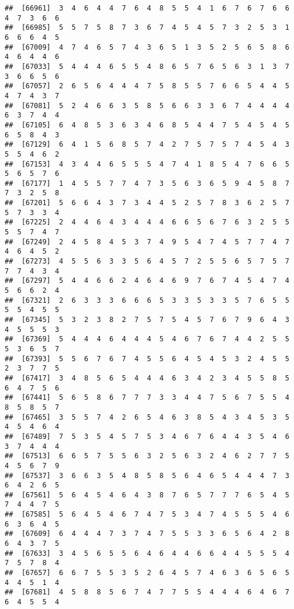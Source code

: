 \documentclass[
]{book}
\begin{document}
\begin{verbatim}
##  [66961]  3  4  6  4  4  7  6  4  8  5  5  4  1  6  7  6  7  6  6  4  7  3  6  6
##  [66985]  5  5  7  5  8  7  3  6  7  4  5  4  5  7  3  2  5  3  1  6  6  6  4  5
##  [67009]  4  7  4  6  5  7  4  3  6  5  1  3  5  2  5  6  5  8  6  4  6  4  4  6
##  [67033]  5  4  4  4  6  5  5  4  8  6  5  7  6  5  6  3  1  3  7  3  6  6  5  6
##  [67057]  2  6  5  6  4  4  4  7  5  8  5  5  7  6  6  5  4  4  5  4  7  4  3  7
##  [67081]  5  2  4  6  6  3  5  8  5  6  6  3  3  6  7  4  4  4  4  6  3  7  4  4
##  [67105]  6  4  8  5  3  6  3  4  6  8  5  4  4  7  5  4  5  4  5  6  5  8  4  3
##  [67129]  6  4  1  5  6  8  5  7  4  2  7  5  7  5  7  4  5  4  3  5  5  4  6  2
##  [67153]  4  3  4  4  6  5  5  5  4  7  4  1  8  5  4  7  6  6  5  5  6  5  7  6
##  [67177]  1  4  5  5  7  7  4  7  3  5  6  3  6  5  9  4  5  8  7  7  3  2  5  8
##  [67201]  5  6  6  4  3  7  3  4  4  5  2  5  7  8  3  6  2  5  7  5  7  3  3  4
##  [67225]  2  4  4  6  4  3  4  4  4  6  6  5  6  7  6  3  2  5  5  5  5  7  4  7
##  [67249]  2  4  5  8  4  5  3  7  4  9  5  4  7  4  5  7  7  4  7  4  6  4  5  2
##  [67273]  4  5  5  6  3  3  5  6  4  5  7  2  5  5  6  5  7  5  7  7  7  4  3  4
##  [67297]  5  4  4  6  6  2  4  6  4  6  9  7  6  7  4  5  4  7  4  5  6  6  2  4
##  [67321]  2  6  3  3  3  6  6  6  5  3  3  5  3  3  5  7  6  5  5  5  5  4  5  5
##  [67345]  5  3  2  3  8  2  7  5  7  5  4  5  7  6  7  9  6  4  3  4  5  5  5  3
##  [67369]  5  4  4  4  6  4  4  4  5  4  6  7  6  7  4  4  2  5  5  5  3  6  5  7
##  [67393]  5  5  6  7  6  7  4  5  5  6  4  5  4  5  3  2  4  5  5  2  3  7  7  5
##  [67417]  3  4  8  5  6  5  4  4  4  6  3  4  2  3  4  5  5  8  5  6  4  7  5  6
##  [67441]  5  6  5  8  6  7  7  7  3  3  4  4  7  5  6  7  5  5  4  8  5  8  5  7
##  [67465]  3  5  5  7  4  2  6  5  4  6  3  8  5  4  3  4  5  3  5  4  5  4  6  4
##  [67489]  7  5  3  5  4  5  7  5  3  4  6  7  6  4  4  3  5  4  6  3  7  4  4  4
##  [67513]  6  6  5  7  5  5  6  3  2  5  6  3  2  4  6  2  7  7  5  4  5  6  7  9
##  [67537]  3  6  6  3  5  4  8  5  8  5  6  4  6  5  4  4  4  7  3  6  4  2  6  5
##  [67561]  5  6  4  5  4  6  4  3  8  7  6  5  7  7  7  6  5  4  5  7  4  4  7  5
##  [67585]  5  6  4  5  4  6  7  4  7  5  3  4  7  4  5  5  5  4  6  6  3  6  4  5
##  [67609]  6  4  4  4  7  3  7  4  7  5  5  3  3  6  5  6  4  2  8  6  4  3  7  5
##  [67633]  3  4  5  6  5  5  6  4  6  4  4  6  6  4  4  5  5  5  4  7  5  7  8  4
##  [67657]  6  6  7  5  5  3  5  2  6  4  5  7  4  6  3  6  5  6  5  4  4  5  1  4
##  [67681]  4  5  8  8  5  6  7  4  7  7  5  5  4  4  4  6  4  6  7  6  4  5  5  4

\end{verbatim}
\end{document}
